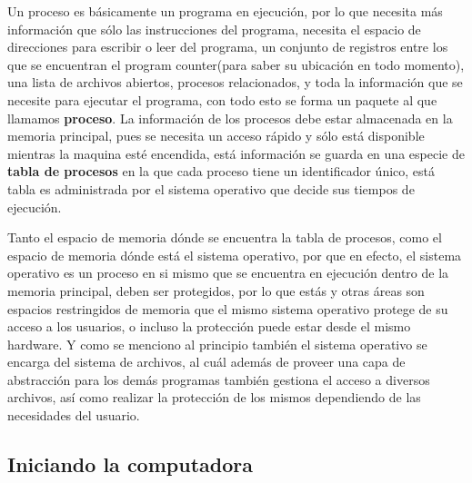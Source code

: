 \documentclass[letterpaper,12pt,oneside]{book}
\begin{document}
		Un proceso es básicamente un programa en ejecución, por lo que necesita más información que sólo las instrucciones del programa, necesita
		el espacio de direcciones para escribir o leer del programa, un conjunto de registros entre los que se encuentran el
		program counter(para saber su ubicación en todo momento), una lista de archivos abiertos, procesos relacionados, y toda la información
		que se necesite para ejecutar el programa, con todo esto se forma un paquete al que llamamos \textbf{proceso}. La información de los procesos
		debe estar almacenada en la memoria principal, pues se necesita un acceso rápido y sólo está disponible mientras la maquina esté encendida, está
		información se guarda en una especie de \textbf{tabla de procesos} en la que cada proceso tiene un identificador único, está tabla es administrada 
		por el sistema operativo que decide sus tiempos de ejecución\cite{tanenbaum_modern_2002}.
		
		Tanto el espacio de memoria dónde se encuentra la tabla de procesos, como el espacio de memoria dónde está el sistema operativo, por que
		en efecto, el sistema operativo es un proceso en si mismo que se encuentra en ejecución dentro de la memoria principal, deben ser protegidos,
		por lo que estás y otras áreas son espacios restringidos de memoria que el mismo sistema operativo protege de su acceso a los usuarios, o incluso
		la protección puede estar desde el mismo hardware. Y como se menciono al principio también el sistema operativo se encarga del sistema
		de archivos, al cuál además de proveer una capa de abstracción para los demás programas también gestiona el acceso a diversos archivos,
		así como realizar la protección de los mismos dependiendo de las necesidades del usuario\cite{tanenbaum_modern_2002}.
		
		\subsection{Iniciando la computadora}
		
\end{document}
